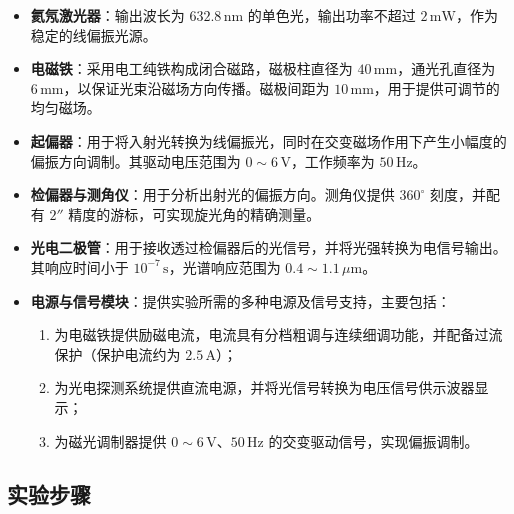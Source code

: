 \documentclass[a4paper, 1.5lines]{ctexart}
\begin{document}
\begin{itemize}
    \item \textbf{氦氖激光器}：输出波长为 $632.8\,\mathrm{nm}$ 的单色光，输出功率不超过 $2\,\mathrm{mW}$，作为稳定的线偏振光源。
    
    \item \textbf{电磁铁}：采用电工纯铁构成闭合磁路，磁极柱直径为 $40\,\mathrm{mm}$，通光孔直径为 $6\,\mathrm{mm}$，以保证光束沿磁场方向传播。磁极间距为 $10\,\mathrm{mm}$，用于提供可调节的均匀磁场。
    
    \item \textbf{起偏器}：用于将入射光转换为线偏振光，同时在交变磁场作用下产生小幅度的偏振方向调制。其驱动电压范围为 $0\sim 6\,\mathrm{V}$，工作频率为 $50\,\mathrm{Hz}$。
    
    \item \textbf{检偏器与测角仪}：用于分析出射光的偏振方向。测角仪提供 $360^\circ$ 刻度，并配有 $2''$ 精度的游标，可实现旋光角的精确测量。
    
    \item \textbf{光电二极管}：用于接收透过检偏器后的光信号，并将光强转换为电信号输出。其响应时间小于 $10^{-7}\,\mathrm{s}$，光谱响应范围为 $0.4\sim1.1\,\mu\mathrm{m}$。
    
    \item \textbf{电源与信号模块}：提供实验所需的多种电源及信号支持，主要包括：
    \begin{enumerate}
        \item 为电磁铁提供励磁电流，电流具有分档粗调与连续细调功能，并配备过流保护（保护电流约为 $2.5\,\mathrm{A}$）；
        \item 为光电探测系统提供直流电源，并将光信号转换为电压信号供示波器显示；
        \item 为磁光调制器提供 $0\sim 6\,\mathrm{V}$、$50\,\mathrm{Hz}$ 的交变驱动信号，实现偏振调制。
    \end{enumerate}
\end{itemize}

\subsection{实验步骤}
\end{document}

